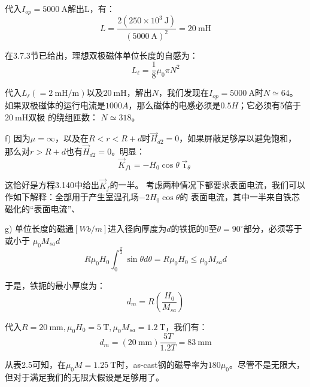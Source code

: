代入$I_{op}=5000\ \mathrm{A}$解出L，有：
\begin{equation*}
L=\frac{2(250\times10^{3}\ \mathrm{J})}{(5000\ \mathrm{A})^{2}}=20\ \mathrm{mH}
\end{equation*}

在3.7.3节已给出，理想双极磁体单位长度的自感为： 
\begin{equation}
L_{\ell}=\frac{1}{8}\mu_{0}\pi N^{2}%
\end{equation}

代入$L_{\ell}(=2\ \mathrm{mH/m})$以及$20\ \mathrm{mH}$，解出$N$，我们发现在$I_{op} = 5000\ \mathrm{A}$时$N\simeq 64$。
如果双极磁体的运行电流是$1000A$，那么磁体的电感必须是$0.5H$；它必须有5倍于$20\ \mathrm{mH}$双极
的绕组匝数： $N\simeq 318$。

f) 因为$\mu=\infty$，以及在$R< r< R+d$时$\vec{H}_{d2}=0$，如果屏蔽足够厚以避免饱和，
那么对$r>R+d$也有$\vec{H}_{d2}=0$。明显：
\begin{equation}
\vec{K}_{f1}=-H_{0}\cos\theta\vec{\imath}_{\theta}%
\end{equation}

这恰好是方程3.140中给出$\vec{K}_f$的一半。
考虑两种情况下都要求表面电流，我们可以作如下解释：全部用于产生室温孔场$-2H_0\cos\theta$的
表面电流，其中一半来自铁芯磁化的“表面电流”、

g) 单位长度的磁通$[Wb/m]$进入径向厚度为$d$的铁扼的0至$\theta=90^\circ$部分，必须等于或小于
$\mu_0 M_{sa}d$
\begin{equation}
R\mu_{0}H_{0}\int_{0}^{\frac{\pi}{2}}\sin\theta d\theta=R\mu_{0}H_{0}\leq\mu_{0}M_{sa}d%
\end{equation}

于是，铁扼的最小厚度为：
\begin{equation}
d_{m}=R(\frac{H_{0}}{M_{sa}})%
\end{equation}

代入$R=20\ \mathrm{mm}, \mu_0 H_0=5\ \mathrm{T}, \mu_0 M_{sa}=1.2\ \mathrm{T}$，我们有：
\begin{equation*}
d_{m}=(20\ \mathrm{mm})\frac{5T}{1.2T}=83\ \mathrm{mm}
\end{equation*}

从表2.5可知，在$\mu_0 M=1.25\ \mathrm{T}$时，as-cast钢的磁导率为$180\mu_0$。尽管不是无限大，
但对于满足我们的无限大假设是足够用了。
\newpage

